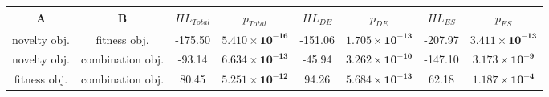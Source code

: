 \begin{tabular}{cccccccc}
\toprule
           A &                B & ${HL}_{Total}$ &                      $p_{Total}$ & ${HL}_{DE}$ &                         $p_{DE}$ & ${HL}_{ES}$ &                         $p_{ES}$ \\
\midrule
novelty obj. &     fitness obj. &        -175.50 & $\mathbf{5.410 \times 10^{-16}}$ &     -151.06 & $\mathbf{1.705 \times 10^{-13}}$ &     -207.97 & $\mathbf{3.411 \times 10^{-13}}$ \\
novelty obj. & combination obj. &         -93.14 & $\mathbf{6.634 \times 10^{-13}}$ &      -45.94 & $\mathbf{3.262 \times 10^{-10}}$ &     -147.10 &  $\mathbf{3.173 \times 10^{-9}}$ \\
fitness obj. & combination obj. &          80.45 & $\mathbf{5.251 \times 10^{-12}}$ &       94.26 & $\mathbf{5.684 \times 10^{-13}}$ &       62.18 &  $\mathbf{1.187 \times 10^{-4}}$ \\
\bottomrule
\end{tabular}
